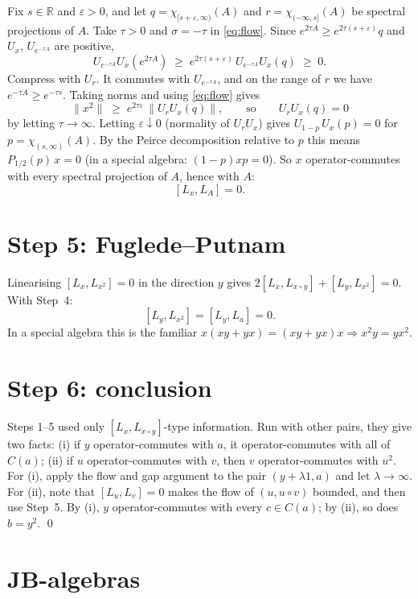 \documentclass[11pt]{article}
\theoremstyle{remark}
\newcommand{\jp}{\circ}
\newcommand{\Pp}{P_{1/2}}
\begin{document}
Fix $s\in\mathbb R$ and $\varepsilon>0$, and let $q = \chi_{[s+\varepsilon,\infty)}(A)$
and $r = \chi_{(-\infty,s]}(A)$ be spectral projections of $A$.
Take $\tau>0$ and $\sigma=-\tau$ in \eqref{eq:flow}.
Since $e^{2\tau A}\geq e^{2\tau(s+\varepsilon)}q$ and $U_x$, $U_{e^{-\tau A}}$ are
positive,
\[
  U_{e^{-\tau A}}U_x(e^{2\tau A}) \;\geq\; e^{2\tau(s+\varepsilon)}\,
  U_{e^{-\tau A}}U_x(q) \;\geq\; 0 .
\]
Compress with $U_r$. It commutes with $U_{e^{-\tau A}}$, and on the range of
$r$ we have $e^{-\tau A}\geq e^{-\tau s}$. Taking norms and using
\eqref{eq:flow} gives
\[
  \|x^2\| \;\geq\; e^{2\tau\varepsilon}\,\bigl\|U_r U_x(q)\bigr\| ,
  \qquad\text{so}\qquad U_rU_x(q) = 0
\]
by letting $\tau\to\infty$.
Letting $\varepsilon\downarrow 0$ (normality of $U_r U_x$) gives
$U_{1-p}\,U_x(p) = 0$ for $p = \chi_{(s,\infty)}(A)$.
By the Peirce decomposition relative to $p$ this means $\Pp(p)\,x = 0$ (in a
special algebra: $(1-p)xp = 0$).
So $x$ operator-commutes with every spectral projection of $A$, hence with $A$:
\[
  [L_x, L_A] = 0 .
\]

\section*{Step 5: Fuglede--Putnam}

Linearising $[L_x,L_{x^2}] = 0$ in the direction $y$ gives
$2[L_x,L_{x\jp y}] + [L_y, L_{x^2}] = 0$. With Step~4:
\[
  [L_y, L_{x^2}] = [L_y, L_a] = 0 .
\]
In a special algebra this is the familiar
$x(xy+yx) = (xy+yx)x \Rightarrow x^2y = yx^2$.

\section*{Step 6: conclusion}

Steps 1--5 used only $[L_x,L_{x\jp y}]$-type information. Run with other pairs,
they give two facts:
(i) if $y$ operator-commutes with $a$, it operator-commutes with all of $C(a)$;
(ii) if $u$ operator-commutes with $v$, then $v$ operator-commutes with $u^2$.
For (i), apply the flow and gap argument to the pair $(y+\lambda 1,a)$ and let
$\lambda\to\infty$. For (ii), note that $[L_u,L_v]=0$ makes the flow of
$(u,u\jp v)$ bounded, and then use Step~5.
By (i), $y$ operator-commutes with every $c\in C(a)$; by (ii), so does
$b = y^2$. \qed

\section*{JB-algebras}
\end{document}
